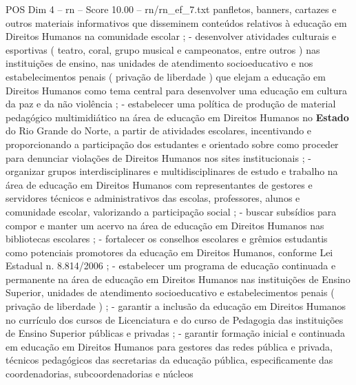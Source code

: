 \begin{textsample}{POS Dim 4 – rn – Score 10.00 – rn/rn\_ef\_7.txt}
panfletos, banners, cartazes e outros materiais informativos que disseminem conteúdos relativos à educação em Direitos Humanos na comunidade escolar ; - desenvolver atividades culturais e esportivas ( teatro, coral, grupo musical e campeonatos, entre outros ) nas instituições de ensino, nas unidades de atendimento socioeducativo e nos estabelecimentos penais ( privação de liberdade ) que elejam a educação em Direitos Humanos como tema central para desenvolver uma educação em cultura da paz e da não violência ; - estabelecer uma política de produção de material pedagógico multimidiático na área de educação em Direitos Humanos no \textbf{Estado} do Rio Grande do Norte, a partir de atividades escolares, incentivando e proporcionando a participação dos estudantes e orientado sobre como proceder para denunciar violações de Direitos Humanos nos sites institucionais ; - organizar grupos interdisciplinares e multidisciplinares de estudo e trabalho na área de educação em Direitos Humanos com representantes de gestores e servidores técnicos e administrativos das escolas, professores, alunos e comunidade escolar, valorizando a participação social ; - buscar subsídios para compor e manter um acervo na área de educação em Direitos Humanos nas bibliotecas escolares ; - fortalecer os conselhos escolares e grêmios estudantis como potenciais promotores da educação em Direitos Humanos, conforme Lei Estadual n. 8.814/2006 ; - estabelecer um programa de educação continuada e permanente na área de educação em Direitos Humanos nas instituições de Ensino Superior, unidades de atendimento socioeducativo e estabelecimentos penais ( privação de liberdade ) ; - garantir a inclusão da educação em Direitos Humanos no currículo dos cursos de Licenciatura e do curso de Pedagogia das instituições de Ensino Superior públicas e privadas ; - garantir formação inicial e continuada em educação em Direitos Humanos para gestores das redes pública e privada, técnicos pedagógicos das secretarias da educação pública, especificamente das coordenadorias, subcoordenadorias e núcleos

\end{textsample}
